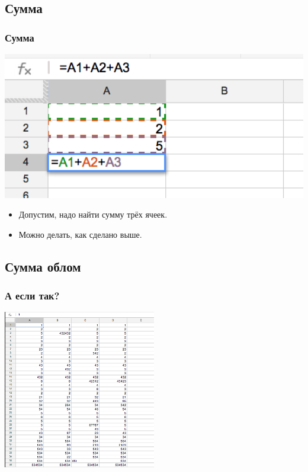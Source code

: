 \documentclass[compress,red]{beamer}
\begin{document}
\subsection{Сумма}
\begin{frame}[fragile]
  \frametitle{Сумма}
  \centerline{\includegraphics[width=1.0\textwidth]{images/06.png}}
  \begin{itemize}
      \item Допустим, надо найти сумму трёх ячеек.
      \item Можно делать, как сделано выше.
  \end{itemize}
\end{frame}

\subsection{Сумма облом}
\begin{frame}[fragile]
  \frametitle{А если так?}
  \centerline{\includegraphics[width=0.5\textwidth]{images/07.png}}
\end{frame}
\end{document}
